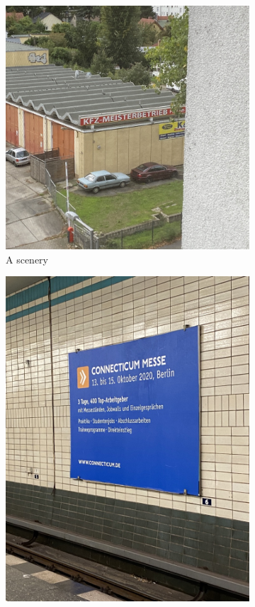\documentclass[10pt, a4paper]{article}
\begin{document}
\begin{figure}[h!]
	\centering
	\begin{subfigure}[b]{0.4\linewidth}
	  \includegraphics[width=\linewidth]{img/sample2.jpeg}
	  \caption{A scenery}
	\end{subfigure}
	\begin{subfigure}[b]{0.4\linewidth}
		\includegraphics[width=\linewidth]{img/sample3.jpeg}

\end{subfigure}
\end{figure}
\end{document}
